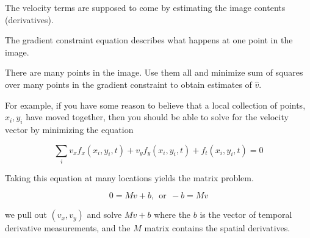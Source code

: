 The velocity terms are supposed to come by estimating the
image contents (derivatives).

The gradient constraint equation describes what 
happens at one point in the image.  

There are many points in the image.  
Use them all and
minimize sum of squares over many points
in the gradient constraint to obtain estimates of $\hat{v}$.

For example, if you have some reason to believe that a local
collection of points, $x_i , y_i$ have moved together, then
you should be able to solve for the velocity vector
by minimizing the equation

\begin{equation}
\sum_{i} v_x f_x(x_i,y_i,t) + v_y f_y(x_i,y_i,t) + f_t(x_i,y_i,t) = 0
\end{equation}

Taking this equation at many locations yields the
matrix problem.

\[
0 = M v + b, ~~\mbox{or} ~~ -b = Mv
\]

we pull out $(v_x,v_y)$ and solve $M v + b$
where the $b$ is the vector of temporal derivative
measurements, and the $M$ matrix contains the spatial derivatives.



